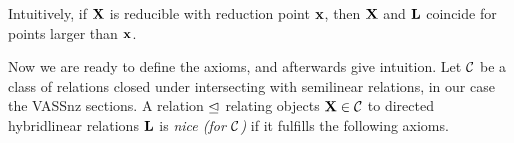 Intuitively, if \(\mathbf{X}\) is reducible with reduction point \(\mathbf{x}\), then $\mathbf{X}$ and $\mathbf{L}$ coincide for points larger than $\mathbf{x}$.

Now we are ready to define the axioms, and afterwards give intuition. Let \(\mathcal{C}\) be a class of relations closed under intersecting with semilinear relations, in our case the VASSnz sections. A relation \(\trianglelefteq\) relating objects \(\mathbf{X} \in \mathcal{C}\) to directed hybridlinear relations \(\mathbf{L}\) is \emph{nice (for \(\mathcal{C}\))} if it fulfills the following axioms.

